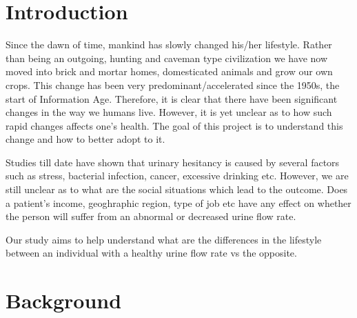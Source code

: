 \documentclass[twoside,11pt]{article}
\begin{document}
\section{Introduction}

Since the dawn of time, mankind has slowly changed his/her lifestyle. Rather than being an outgoing, hunting and caveman type civilization we have now moved into brick and mortar homes, domesticated animals and grow our own crops. This change has been very predominant/accelerated since the 1950s, the start of Information Age. Therefore, it is clear that there have been significant changes in the way we humans live. However, it is yet unclear as to how such rapid changes affects one's health. The goal of this project is to understand this change and how to better adopt to it.

\vspace{5mm} Studies till date have shown that urinary hesitancy is caused by several factors such as stress, bacterial infection, cancer, excessive drinking etc. However, we are still unclear as to what are the social situations which lead to the outcome. Does a patient's income, geoghraphic region, type of job etc have any effect on whether the person will suffer from an abnormal or decreased urine flow rate.

\vspace{5mm} Our study aims to help understand what are the differences in the lifestyle between an individual with a healthy urine flow rate vs the opposite.


\section{Background} \label{background}
\end{document}
